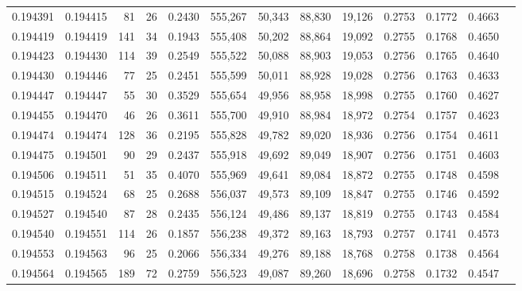 \begin{tabular}{rrrrrrrrrrrrr}
0.194391 & 0.194415 &    81 &  26 &                                     0.2430 & 555,267 &  50,343 &  88,830 &  19,126 & 0.2753 & 0.1772 & 0.4663 \\
0.194419 & 0.194419 &   141 &  34 &                                     0.1943 & 555,408 &  50,202 &  88,864 &  19,092 & 0.2755 & 0.1768 & 0.4650 \\
0.194423 & 0.194430 &   114 &  39 &                                     0.2549 & 555,522 &  50,088 &  88,903 &  19,053 & 0.2756 & 0.1765 & 0.4640 \\
0.194430 & 0.194446 &    77 &  25 &                                     0.2451 & 555,599 &  50,011 &  88,928 &  19,028 & 0.2756 & 0.1763 & 0.4633 \\
0.194447 & 0.194447 &    55 &  30 &                                     0.3529 & 555,654 &  49,956 &  88,958 &  18,998 & 0.2755 & 0.1760 & 0.4627 \\
0.194455 & 0.194470 &    46 &  26 &                                     0.3611 & 555,700 &  49,910 &  88,984 &  18,972 & 0.2754 & 0.1757 & 0.4623 \\
0.194474 & 0.194474 &   128 &  36 &                                     0.2195 & 555,828 &  49,782 &  89,020 &  18,936 & 0.2756 & 0.1754 & 0.4611 \\
0.194475 & 0.194501 &    90 &  29 &                                     0.2437 & 555,918 &  49,692 &  89,049 &  18,907 & 0.2756 & 0.1751 & 0.4603 \\
0.194506 & 0.194511 &    51 &  35 &                                     0.4070 & 555,969 &  49,641 &  89,084 &  18,872 & 0.2755 & 0.1748 & 0.4598 \\
0.194515 & 0.194524 &    68 &  25 &                                     0.2688 & 556,037 &  49,573 &  89,109 &  18,847 & 0.2755 & 0.1746 & 0.4592 \\
0.194527 & 0.194540 &    87 &  28 &                                     0.2435 & 556,124 &  49,486 &  89,137 &  18,819 & 0.2755 & 0.1743 & 0.4584 \\
0.194540 & 0.194551 &   114 &  26 &                                     0.1857 & 556,238 &  49,372 &  89,163 &  18,793 & 0.2757 & 0.1741 & 0.4573 \\
0.194553 & 0.194563 &    96 &  25 &                                     0.2066 & 556,334 &  49,276 &  89,188 &  18,768 & 0.2758 & 0.1738 & 0.4564 \\
0.194564 & 0.194565 &   189 &  72 &                                     0.2759 & 556,523 &  49,087 &  89,260 &  18,696 & 0.2758 & 0.1732 & 0.4547 \\

\end{tabular}
